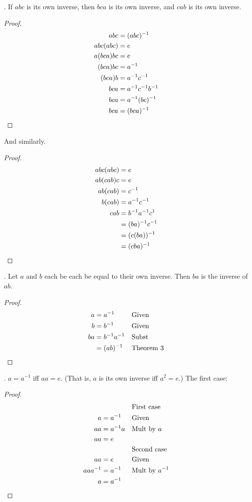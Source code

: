 \documentclass[twoside]{amsart}
\newcommand{\Blank}{\mathrel{\phantom{=}}}
\begin{document}
\begin{enumerate}[A.]
   . If $abc$ is its own inverse, then $bca$ is its own inverse,
   and $cab$ is its own inverse.
   \begin{proof}
      \begin{align*}
         abc & = (abc)^{-1}     \\
	 abc(abc) & = e  \\
	 a(bca)bc & = e  \\
	 (bca)bc & = a^{-1} \\
	 (bca)b  & = a^{-1}c^{-1} \\
	 bca     & = a^{-1}c^{-1}b^{-1} \\
	 bca     & = a^{-1}(bc)^{-1} \\
	 bca     & = (bca)^{-1} \qedhere
      \end{align*}
   \end{proof}
   And similarly.
   \begin{proof}
      \begin{align*}
         abc(abc) & = e \\
	 ab(cab)c & = e \\
	 ab(cab)  & = c^{-1} \\
	 b(cab)   & = a^{-1}c^{-1} \\
	 cab      & = b^{-1}a^{-1}c^{1} \\
	          & = (ba)^{-1}c^{-1}   \\
		  & = (c(ba))^{-1} \\
		  & = (cba) ^{-1} \qedhere
      \end{align*}
   \end{proof}

   . Let $a$ and $b$ each be each be equal to their own inverse.
   Then $ba$ is the inverse of $ab$.
   \begin{proof}
      \begin{align*}
        a & = a^{-1}       && \text{Given} \\
	b & = b^{-1}       && \text{Given} \\
        ba & = b^{-1}a^{-1}  && \text{Subst} \\
           & = (ab)^{-1} && \text{Theorem 3}  \qedhere
      \end{align*}
   \end{proof}
   
   . $a=a^{-1}$ iff $aa=e$. (That is, $a$ is its own inverse iff
   $a^2 = e$.)
   The first case:
   \begin{proof}
      \begin{align*}
            & \Blank       && \text{First case} \\
         a  & = a^{-1}     && \text{Given} \\
	 aa & = a^{-1}a    && \text{Mult by $a$} \\
	 aa & = e \\
	    & \Blank       && \text{Second case} \\
	 aa & = e          && \text{Given}\\
	 aaa^{-1} & =  a^{-1} && \text{Mult by $a^{-1}$}\\   
	 a  & = a^{-1}     && \qedhere
      \end{align*}
   \end{proof}


\end{enumerate}
\end{document}
